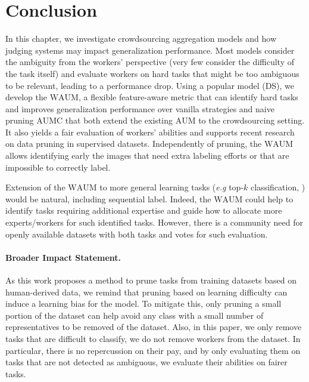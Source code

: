 \section{Conclusion}
In this chapter, we investigate crowdsourcing aggregation models and how judging systems may impact generalization performance.
Most models consider the ambiguity from the workers' perspective (very few consider the difficulty of the task itself) and evaluate workers on hard tasks that might be too ambiguous to be relevant, leading to a performance drop.
Using a popular model (DS), we develop the $\mathrm{WAUM}$, a flexible feature-aware metric that can identify hard tasks and improves generalization performance over vanilla strategies and naive pruning $\mathrm{AUMC}$ that both extend the existing $\mathrm{AUM}$ to the crowdsourcing setting.
It also yields a fair evaluation of workers' abilities and supports recent research on data pruning in supervised datasets.
Independently of pruning, the $\mathrm{WAUM}$ allows identifying early the images that need extra labeling efforts or that are impossible to correctly label.

Extension of the $\mathrm{WAUM}$ to more general learning tasks (\emph{e.g} top-$k$ classification, ) would be natural, including sequential label.
Indeed, the $\mathrm{WAUM}$ could help to identify tasks requiring additional expertise and guide how to allocate more experts/workers for such identified tasks. However, there is a community need for openly available datasets with both tasks and votes for such evaluation.

\paragraph*{Broader Impact Statement.}
As this work proposes a method to prune tasks from training datasets based on human-derived data, we remind that pruning based on learning difficulty can induce a learning bias for the model.
To mitigate this, only pruning a small portion of the dataset can help avoid any class with a small number of representatives to be removed of the dataset.
Also, in this paper, we only remove tasks that are difficult to classify, we do not remove workers from the dataset.
In particular, there is no repercussion on their pay, and by only evaluating them on tasks that are not detected as ambiguous, we evaluate their abilities on fairer tasks.

